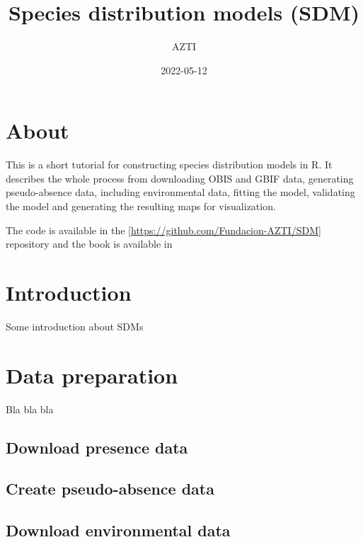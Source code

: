 \documentclass[
]{book}
\title{Species distribution models (SDM)}
\author{AZTI}
\date{2022-05-12}
\begin{document}
\maketitle

{
\setcounter{tocdepth}{1}
\tableofcontents
}
\hypertarget{about}{%
\chapter{About}\label{about}}

This is a short tutorial for constructing species distribution models in R. It describes the whole process from downloading OBIS and GBIF data, generating pseudo-absence data, including environmental data, fitting the model, validating the model and generating the resulting maps for visualization.

The code is available in the {[}\url{https://github.com/Fundacion-AZTI/SDM}{]} repository and the book is available in

\hypertarget{introduction}{%
\chapter{Introduction}\label{introduction}}

Some introduction about SDMs

\hypertarget{data-preparation}{%
\chapter{Data preparation}\label{data-preparation}}

Bla bla bla

\hypertarget{download-presence-data}{%
\section{Download presence data}\label{download-presence-data}}

\hypertarget{create-pseudo-absence-data}{%
\section{Create pseudo-absence data}\label{create-pseudo-absence-data}}

\hypertarget{download-environmental-data}{%
\section{Download environmental data}\label{download-environmental-data}}
\end{document}
